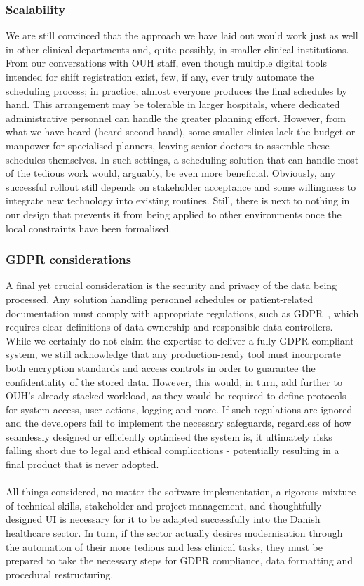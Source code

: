 \subsubsection*{Scalability}
We are still convinced that the approach we have laid out would work just as well in other clinical departments and, quite possibly, in smaller clinical institutions. From our conversations with OUH staff, even though multiple digital tools intended for shift registration exist, few, if any, ever truly automate the scheduling process; in practice, almost everyone produces the final schedules by hand. This arrangement may be tolerable in larger hospitals, where dedicated administrative personnel can handle the greater planning effort. However, from what we have heard (heard second-hand), some smaller clinics lack the budget or manpower for specialised planners, leaving senior doctors to assemble these schedules themselves. In such settings, a scheduling solution that can handle most of the tedious work would, arguably, be even more beneficial. Obviously, any successful rollout still depends on stakeholder acceptance and some willingness to integrate new technology into existing routines. Still, there is next to nothing in our design that prevents it from being applied to other environments once the local constraints have been formalised.

\subsubsection*{GDPR considerations}
A final yet crucial consideration is the security and privacy of the data being processed. Any solution handling personnel schedules or patient-related documentation must comply with appropriate regulations, such as GDPR~\cite{EU-GDPR}, which requires clear definitions of data ownership and responsible data controllers. While we certainly do not claim the expertise to deliver a fully GDPR-compliant system, we still acknowledge that any production-ready tool must incorporate both encryption standards and access controls in order to guarantee the confidentiality of the stored data. However, this would, in turn, add further to OUH's already stacked workload, as they would be required to define protocols for system access, user actions, logging and more. If such regulations are ignored and the developers fail to implement the necessary safeguards, regardless of how seamlessly designed or efficiently optimised the system is, it ultimately risks falling short due to legal and ethical complications - potentially resulting in a final product that is never adopted.
\\
\\
All things considered, no matter the software implementation, a rigorous mixture of technical skills, stakeholder and project management, and thoughtfully designed UI is necessary for it to be adapted successfully into the Danish healthcare sector. In turn, if the sector actually desires modernisation through the automation of their more tedious and less clinical tasks, they must be prepared to take the necessary steps for GDPR compliance, data formatting and procedural restructuring. 